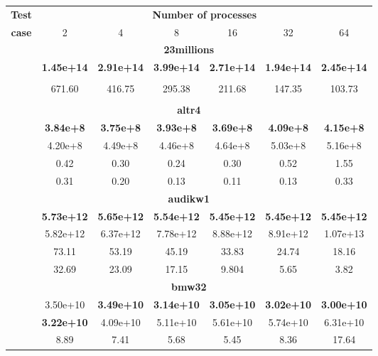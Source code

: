 \documentclass[fleqn,12pt,twoside]{article}
\begin{document}
\begin{table}[hbt]
\begin{center}
  \begin{tabular}{|l||c|c|c|c|c|c|}
    \hline
    \multicolumn{1}{|c||}{{\bf Test}} &
    \multicolumn{6}{c|}{{\bf Number of processes}}\\
    \cline{2-7}
     \multicolumn{1}{|c||}{{\bf case}} & 2 & 4 & 8 & 16 & 32 & 64 \\
    \hline
    \hline
    \multicolumn{7}{|c|}{{\bf 23millions}} \\
    \hline
     & \textbf{1.45e+14} & \textbf{2.91e+14} & \textbf{3.99e+14} & \textbf{2.71e+14} & \textbf{1.94e+14} & \textbf{2.45e+14} \\
      &   & &  &  &  &    \\
     & 671.60 & 416.75 & 295.38 & 211.68 & 147.35 & 103.73 \\
      &   & &  &  &  &  \\
    \hline
    \multicolumn{7}{|c|}{{\bf altr4}} \\
    \hline
     & \textbf{3.84e+8}  & \textbf{3.75e+8}  & \textbf{3.93e+8}  & \textbf{3.69e+8}  & \textbf{4.09e+8}  & \textbf{4.15e+8}   \\
      & 4.20e+8  & 4.49e+8  & 4.46e+8  & 4.64e+8  & 5.03e+8  & 5.16e+8  \\
     & 0.42     & 0.30     & 0.24     & 0.30     & 0.52     & 1.55     \\
      & 0.31     & 0.20     & 0.13     & 0.11     & 0.13     & 0.33	\\
    \hline
    \multicolumn{7}{|c|}{{\bf audikw1}} \\
    \hline
     & \textbf{5.73e+12} & \textbf{5.65e+12} & \textbf{5.54e+12} & \textbf{5.45e+12} & \textbf{5.45e+12} & \textbf{5.45e+12} \\
      &  5.82e+12  & 6.37e+12 & 7.78e+12 & 8.88e+12 & 8.91e+12 & 1.07e+13 \\
     & 73.11    & 53.19   & 45.19    & 33.83   &  24.74    & 18.16   \\
      & 32.69    & 23.09    & 17.15    & 9.804    & 5.65     & 3.82     \\
    \hline
\multicolumn{7}{|c|}{{\bf bmw32}} \\
    \hline
     & 3.50e+10 & \textbf{3.49e+10} & \textbf{3.14e+10} & \textbf{3.05e+10}  & \textbf{3.02e+10} & \textbf{3.00e+10} \\
      & \textbf{3.22e+10} & 4.09e+10 & 5.11e+10 & 5.61e+10  & 5.74e+10  & 6.31e+10  \\
     & 8.89     & 7.41     & 5.68     & 5.45     & 8.36     & 17.64   \\

\end{tabular}
\end{center}
\end{table}
\end{document}
